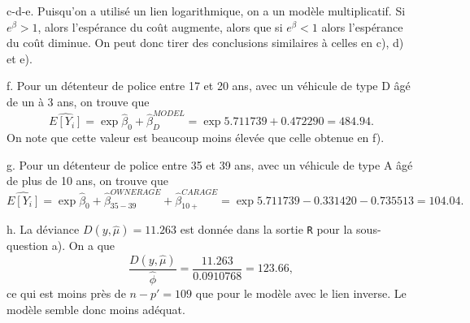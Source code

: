 \begin{solution}{2.8}
\begin{enumerate}
c-d-e. Puisqu'on a utilisé un lien logarithmique, on a un modèle multiplicatif. Si $e^\beta>1$, alors l'espérance du coût augmente, alors que si $e^\beta<1$ alors l'espérance du coût diminue. On peut donc tirer des conclusions similaires à celles en c), d) et e).

f. Pour un détenteur de police entre 17 et 20 ans, avec un véhicule de type D âgé de un à 3 ans, on trouve que $$\widehat{E[Y_i]}=\exp{\hat{\beta}_0+\hat{\beta}^{MODEL}_D}=\exp{5.711739+0.472290}=484.94.$$ On note que cette valeur est beaucoup moins élevée que celle obtenue en f).

g. Pour un détenteur de police entre 35 et 39 ans, avec un véhicule de type A âgé de plus de 10 ans, on trouve que $$\widehat{E[Y_i]}=\exp{\hat{\beta}_0+\hat{\beta}^{OWNERAGE}_{35-39}+\hat{\beta}^{CARAGE}_{10+}}=\exp{5.711739-0.331420-0.735513}=104.04.$$

h. La déviance $D(y,\hat{\mu})=11.263$ est donnée dans la sortie \texttt{R} pour la sous-question a). On a que $$\frac{D(y,\hat{\mu})}{\hat{\phi}}=\frac{11.263}{0.0910768}=123.66,$$ ce qui est moins près de $n-p'=109$ que pour le modèle avec le lien inverse. Le modèle semble donc moins adéquat.
\end{enumerate}
\end{solution}
